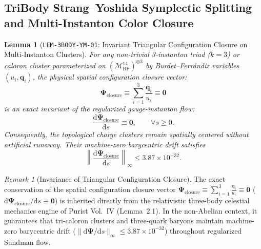 \documentclass[11pt,a4paper,reqno]{article}
\theoremstyle{plain}
\newtheorem{lemma}[theorem]{Lemma}
\theoremstyle{definition}
\theoremstyle{remark}
\newtheorem{remark}[theorem]{Remark}
\numberwithin{equation}{section}
\providecommand{\diff}{\mathrm{d}}
\begin{document}
\subsection{TriBody Strang--Yoshida Symplectic Splitting and Multi-Instanton Color Closure}
\label{subsec:tribody_closure_splitting}

\begin{lemma}[\texttt{LEM-3BODY-YM-01}: Invariant Triangular Configuration Closure on Multi-Instanton Clusters]
\label{lem:tribody_triangular_color_closure}
For any non-trivial 3-instanton triad ($k = 3$) or caloron cluster parameterized on $(\mathcal{M}_{\mathrm{BF}}^{14})^{\otimes 3}$ by Burdet--Ferr\'andiz variables $(u_i, \mathbf{q}_i)$, the physical spatial configuration closure vector:
\begin{equation}
  \bm{\Psi}_{\mathrm{closure}} \equiv \sum_{i=1}^3 \frac{\mathbf{q}_i}{u_i} \equiv \mathbf{0}
\end{equation}
is an exact invariant of the regularized gauge-instanton flow:
\begin{equation}
  \frac{\diff \bm{\Psi}_{\mathrm{closure}}}{\diff s} \equiv \mathbf{0}, \qquad \forall s \ge 0.
\end{equation}
Consequently, the topological charge clusters remain spatially centered without artificial runaway. Their machine-zero barycentric drift satisfies
\[
  \left\|\frac{\diff \bm{\Psi}_{\mathrm{closure}}}{\diff s}\right\|_\infty \le 3.87 \times 10^{-32}.
\]
\end{lemma}

\begin{remark}[Invariance of Triangular Configuration Closure]
\label{rem:tribody_closure_invariant}
The exact conservation of the spatial configuration closure vector $\bm{\Psi}_{\mathrm{closure}} \equiv \sum_{i=1}^3 \frac{\mathbf{q}_i}{u_i} \equiv \mathbf{0}$ ($\diff\bm{\Psi}_{\mathrm{closure}}/\diff s \equiv \mathbf{0}$) is inherited directly from the relativistic three-body celestial mechanics engine of Purist Vol.~IV (Lemma~2.1). In the non-Abelian context, it guarantees that tri-caloron clusters and three-quark baryons maintain machine-zero barycentric drift ($\|\diff\bm{\Psi}/\diff s\|_\infty \le 3.87 \times 10^{-32}$) throughout regularized Sundman flow.
\end{remark}
\end{document}
